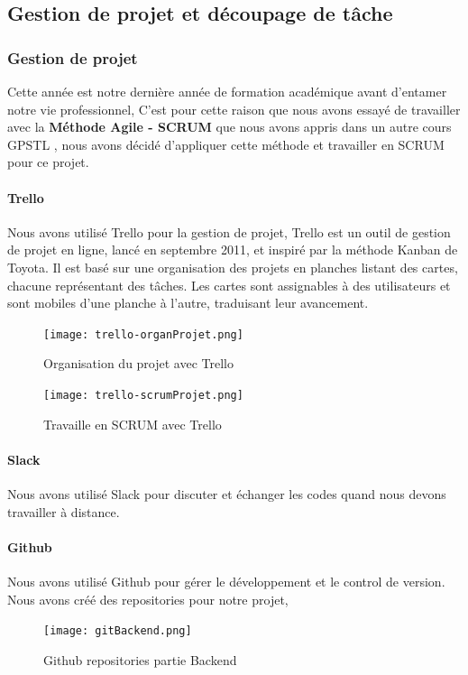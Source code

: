 \documentclass[12pt]{article}
\begin{document}
\subsection{Gestion de projet et découpage de tâche}
\subsubsection{Gestion de projet}
Cette année est notre dernière année de formation académique avant d'entamer notre vie professionnel, C'est pour cette raison que nous avons essayé de travailler avec la  \textbf{Méthode Agile - SCRUM} que nous avons appris dans un autre cours \guillemotleft \space GPSTL \guillemotright, nous avons décidé d'appliquer cette méthode et travailler en SCRUM pour ce projet. 

\paragraph{Trello}
Nous avons utilisé Trello pour la gestion de projet, Trello est un outil de gestion de projet en ligne, lancé en septembre 2011, et inspiré par la méthode Kanban de Toyota. Il est basé sur une organisation des projets en planches listant des cartes, chacune représentant des tâches. Les cartes sont assignables à des utilisateurs et sont mobiles d'une planche à l'autre, traduisant leur avancement.\cite{Trello}
\begin{figure}[H]
    \centering
    \texttt{[image: trello-organProjet.png]}
    \caption{Organisation du projet avec Trello}
    \label{fig:App_Trello_organPorjet}
\end{figure}
\begin{figure}[H]
    \centering
    \texttt{[image: trello-scrumProjet.png]}
    \caption{Travaille en SCRUM avec Trello}
    \label{fig:App_TrelloScrum}
\end{figure}

\paragraph{Slack} Nous avons utilisé Slack pour discuter et échanger les codes quand nous devons travailler à distance. 
\paragraph{Github} Nous avons utilisé Github pour gérer le développement et le control de version. Nous avons créé des repositories pour notre projet, 
\begin{figure}[H]
    \centering
    \texttt{[image: gitBackend.png]}
    \caption{Github repositories partie Backend}
    \label{fig:App_Github_Backend}
\end{figure}
\end{document}
